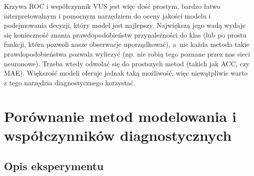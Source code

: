 \documentclass{mini}
\begin{document}
Krzywa ROC i współczynnik VUS jest więc dość prostym, bardzo łatwo interpretowalnym i pomocnym narzędziem do oceny jakości modelu i podejmowania decyzji, który model jest najlepszy. Największą jego wadą wydaje się konieczność znania prawdopodobieństw przynależności do klas (lub po prostu funkcji, która pozwoli nasze obserwacje uporządkować), a~nie każda metoda takie prawdopodobieństwa pozwala wyliczyć (np. nie robią tego poznane przez nas sieci neuronowe). Trzeba wtedy odwołać się do prostszych metod (takich jak ACC, czy MAE). Większość modeli oferuje jednak taką możliwość, więc niewątpliwie warto z tego narzędzia diagnostycznego korzystać.

\chapter{Porównanie metod modelowania i współczynników diagnostycznych}

\section{Opis eksperymentu}
\end{document}
